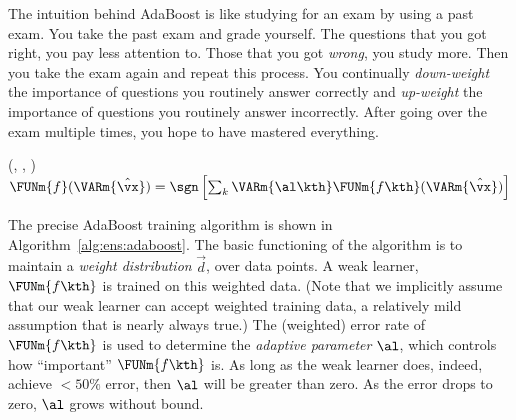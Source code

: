 The intuition behind AdaBoost is like studying for an exam by using
a past exam.  You take the past exam and grade yourself.  The
questions that you got right, you pay less attention to.  Those that
you got \emph{wrong}, you study more.  Then you take the exam again
and repeat this process.  You continually \emph{down-weight} the
importance of questions you routinely answer correctly and
\emph{up-weight} the importance of questions you routinely answer
incorrectly.  After going over the exam multiple times, you hope to
have mastered everything.

%
  {(\FUN{$\cW$}, \VAR{$\cD$}, )}%
  {
\ENDFOR
\RETURN $\FUNm{f}(\VARm{\hat \vx}) = \sgn\left[ \sum_k \VARm{\al\kth} \FUNm{f\kth}(\VARm{\hat\vx}) \right]$
}

The precise AdaBoost training algorithm is shown in
Algorithm~\ref{alg:ens:adaboost}.  The basic functioning of the
algorithm is to maintain a \emph{weight distribution} $\vec d$, over
data points.  A weak learner, $\FUNm{f\kth}$ is trained on this
weighted data.  (Note that we implicitly assume that our weak learner
can accept weighted training data, a relatively mild assumption that
is nearly always true.)  The (weighted) error rate of $\FUNm{f\kth}$
is used to determine the \emph{adaptive parameter} $\al$, which
controls how ``important'' $\FUNm{f\kth}$ is.  As long as the weak
learner does, indeed, achieve $<50\%$ error, then $\al$ will be
greater than zero.  As the error drops to zero, $\al$ grows without
bound.


